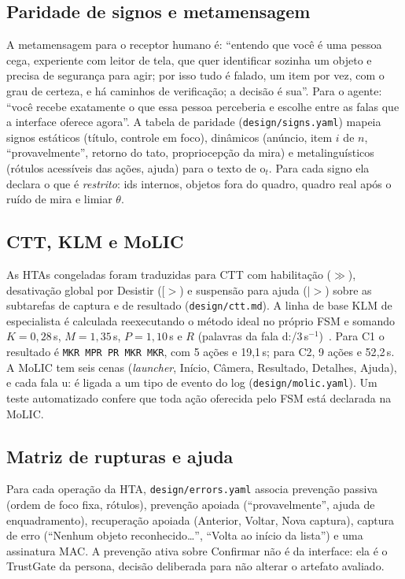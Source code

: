 \documentclass[conference]{IEEEtran}
\begin{document}
\subsection{Paridade de signos e metamensagem}
A metamensagem para o receptor humano é: ``entendo que você é uma pessoa cega, experiente com leitor de tela, que quer identificar sozinha um objeto e precisa de segurança para agir; por isso tudo é falado, um item por vez, com o grau de certeza, e há caminhos de verificação; a decisão é sua''. Para o agente: ``você recebe exatamente o que essa pessoa perceberia e escolhe entre as falas que a interface oferece agora''. A tabela de paridade (\texttt{design/signs.yaml}) mapeia signos estáticos (título, controle em foco), dinâmicos (anúncio, item $i$ de $n$, ``provavelmente'', retorno do tato, propriocepção da mira) e metalinguísticos (rótulos acessíveis das ações, ajuda) para o texto de o$_t$. Para cada signo ela declara o que é \emph{restrito}: ids internos, objetos fora do quadro, quadro real após o ruído de mira e limiar $\theta$.

\subsection{CTT, KLM e MoLIC}
As HTAs congeladas foram traduzidas para CTT com habilitação ($\gg$), desativação global por Desistir ($[>$) e suspensão para ajuda ($|>$) sobre as subtarefas de captura e de resultado (\texttt{design/ctt.md}). A linha de base KLM de especialista é calculada reexecutando o método ideal no próprio FSM e somando $K=0{,}28$\,s, $M=1{,}35$\,s, $P=1{,}10$\,s e $R$ (palavras da fala d:/3\,s$^{-1}$)~\cite{card}. Para C1 o resultado é \texttt{MKR MPR PR MKR MKR}, com 5 ações e 19{,}1\,s; para C2, 9 ações e 52{,}2\,s. A MoLIC tem seis cenas (\textit{launcher}, Início, Câmera, Resultado, Detalhes, Ajuda), e cada fala u: é ligada a um tipo de evento do log (\texttt{design/molic.yaml}). Um teste automatizado confere que toda ação oferecida pelo FSM está declarada na MoLIC.

\subsection{Matriz de rupturas e ajuda}
Para cada operação da HTA, \texttt{design/errors.yaml} associa prevenção passiva (ordem de foco fixa, rótulos), prevenção apoiada (``provavelmente'', ajuda de enquadramento), recuperação apoiada (Anterior, Voltar, Nova captura), captura de erro (``Nenhum objeto reconhecido\ldots'', ``Volta ao início da lista'') e uma assinatura MAC. A prevenção ativa sobre Confirmar não é da interface: ela é o TrustGate da persona, decisão deliberada para não alterar o artefato avaliado.
\end{document}
